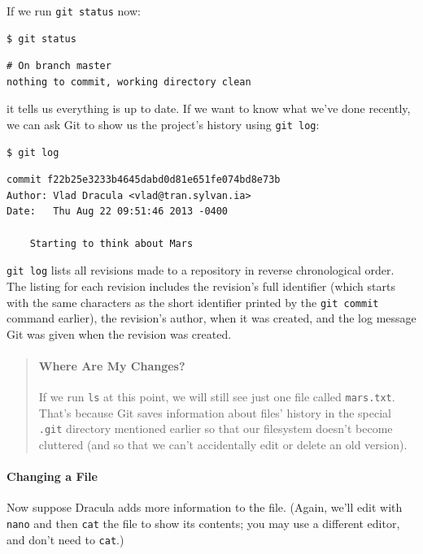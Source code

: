 \documentclass{book}
\begin{document}
If we run \texttt{git status} now:

\begin{verbatim}
$ git status
\end{verbatim}

\begin{verbatim}
# On branch master
nothing to commit, working directory clean
\end{verbatim}

it tells us everything is up to date. If we want to know what we've done
recently, we can ask Git to show us the project's history using
\texttt{git log}:

\begin{verbatim}
$ git log
\end{verbatim}

\begin{verbatim}
commit f22b25e3233b4645dabd0d81e651fe074bd8e73b
Author: Vlad Dracula <vlad@tran.sylvan.ia>
Date:   Thu Aug 22 09:51:46 2013 -0400

    Starting to think about Mars
\end{verbatim}

\texttt{git log} lists all revisions made to a repository in reverse
chronological order. The listing for each revision includes the
revision's full identifier (which starts with the same characters as the
short identifier printed by the \texttt{git commit} command earlier),
the revision's author, when it was created, and the log message Git was
given when the revision was created.

\begin{quote}
\mbox{}\paragraph{Where Are My Changes?}

If we run \texttt{ls} at this point, we will still see just one file
called \texttt{mars.txt}. That's because Git saves information about
files' history in the special \texttt{.git} directory mentioned earlier
so that our filesystem doesn't become cluttered (and so that we can't
accidentally edit or delete an old version).
\end{quote}

\mbox{}\paragraph{Changing a File}

Now suppose Dracula adds more information to the file. (Again, we'll
edit with \texttt{nano} and then \texttt{cat} the file to show its
contents; you may use a different editor, and don't need to
\texttt{cat}.)
\end{document}

